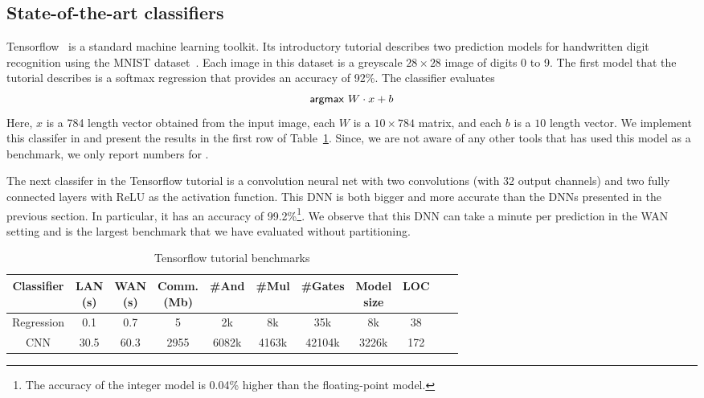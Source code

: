 \subsection{State-of-the-art classifiers}
Tensorflow~\cite{tensorflow} is a standard machine learning toolkit.
Its introductory tutorial describes two prediction models for handwritten digit recognition
using the MNIST dataset~\cite{mnist}.
Each image in this dataset is a greyscale $28\times 28$ image of
digits 0 to 9.
The first model that the tutorial describes is a softmax regression
that provides an accuracy of 92\%. The classifier evaluates
\[
 \mathsf{argmax}\ W\cdot x+b
\]
Here, $x$ is a 784 length vector obtained from the input image,
each $W$ is a $10\times 784$ matrix, and each $b$ is a $10$ length
vector.  
We implement this classifer in \tool and present the results in the
first row of Table~\ref{tab:tf}.
Since, we are not aware of any other tools that has used this
model as a benchmark, we only report numbers for \tool.


The next classifer in the Tensorflow tutorial is a convolution neural net with two convolutions
(with 32 output channels) and two fully connected layers with ReLU as the activation function.
This DNN is both bigger and more accurate than the DNNs presented in the previous section.
In particular, it has an accuracy of 99.2\%\footnote{The accuracy of
  the integer model is 0.04\% higher than the floating-point
  model.}. 
We observe that this DNN can take a minute per prediction in the WAN
setting and is the largest benchmark that we have evaluated without
partitioning.


\setlength\tabcolsep{2.5pt}
\begin{table}
\begin{tabular}{c|c|c|c |c|c|c|c|c|c | c}
Classifier       & \thead{LAN  \\ (s)} & \thead{WAN \\(s)} & \thead{Comm. \\(Mb)}  & \#And & \#Mul & \#Gates & \thead{Model \\size} & LOC\\
\hline
Regression &  0.1         & 0.7         & 5            & 2k    & 8k    &  35k    & 8k   & 38\\
\hline
CNN        &  30.5        & 60.3        & 2955         & 6082k & 4163k &  42104k & 3226k& 172\\
\hline
\end{tabular}

 \caption{Tensorflow tutorial benchmarks}
 \label{tab:tf} 
\end{table}


